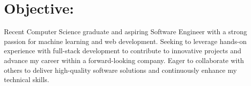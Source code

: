 \documentclass[12pt, oneside, a4paper]{article}
\begin{document}
\section*{Objective:}
\begin{flushleft}
    \footnotesize
    Recent Computer Science graduate and aspiring Software Engineer with a
    strong passion for machine learning and web development. Seeking to
    leverage hands-on experience with full-stack development to contribute to
    innovative projects and advance my career within a forward-looking company.
    Eager to collaborate with others to deliver high-quality software solutions
    and continuously enhance my technical skills.
\end{flushleft}

\begin{paracol}{2}
    \begin{leftcolumn}

\end{leftcolumn}
\end{paracol}
\end{document}

